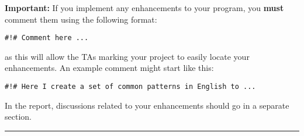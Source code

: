 \documentclass[11pt]{report}
\begin{document}
\begin{Exercise}[title=(* Optional) Enhancements]
\textbf{Important:} If you implement any enhancements to your program, you \textbf{must} comment them using the following format:

\vspace{0.5em}
{\tt \#!\# Comment here ...}
\vspace{0.5em}

as this will allow the TAs marking your project to easily locate your enhancements. An example comment might start like this:

\vspace{0.5em}
{\tt \#!\# Here I create a set of common patterns in English to ...}
\vspace{0.5em}

In the report, discussions related to your enhancements should go in a separate section.\\

\end{Exercise}

\vspace{1em}
\hrule
\vspace{1em}
\end{document}
